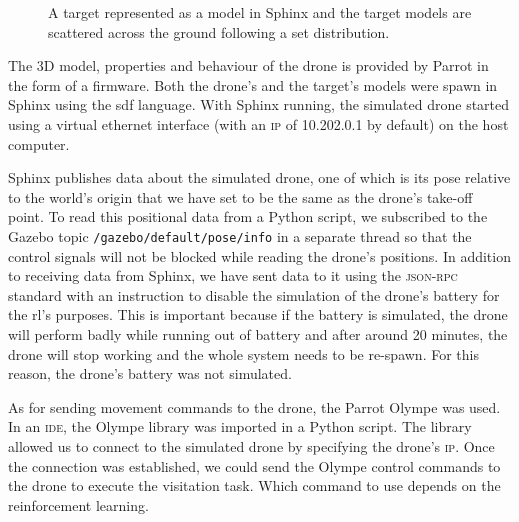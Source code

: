 \documentclass[../main.tex]{subfiles}
\begin{document}
\begin{figure}[tb]%
    \centering
    \hspace{0.5cm}
    \caption{%
        \protect{} 
        A target represented as a model in Sphinx and
        \protect{} 
        the target models are scattered across
        the ground following a set distribution.}%
    \label{fig:target}%
\end{figure}


The 3D model, properties and behaviour
of the \anafi drone is provided by Parrot in the 
form of a firmware. 
Both the drone's and the target's models were spawn
in Sphinx using the \gls{sdf} language.
With Sphinx running, the simulated \anafi drone 
started using
a virtual ethernet interface 
(with an \textsc{ip} of 10.202.0.1 by default) 
on the host computer.

Sphinx publishes data about the simulated drone,
one of which is its pose relative to
the world's origin that we have set to be the same
as the drone's take-off point. 
To read this positional data from a Python script, we 
subscribed to the Gazebo topic 
\texttt{/gazebo\-/default\-/pose\-/info}
in a separate thread so that the control signals
will not be blocked while reading the drone's positions.
In addition to receiving data from Sphinx, we have 
sent data to it using the \textsc{json-rpc} standard
with an instruction to disable
the simulation of the \anafi drone's battery
for the \gls{rl}'s purposes. This is important because
if the battery is simulated, the drone will 
perform badly while running
out of battery and after around 20 minutes, 
the drone will stop working and the whole system
needs to be re-spawn. For this reason, the drone's
battery was not simulated.

As for sending movement commands to the drone,
the Parrot Olympe was used.
In an \textsc{ide}, the Olympe library was imported
in a Python script. The library allowed us to connect
to the simulated drone by specifying the drone's
\textsc{ip}. Once the connection was established, 
we could send the Olympe control commands to the drone
to execute the visitation task. Which command to use
depends on the reinforcement learning.
\end{document}
